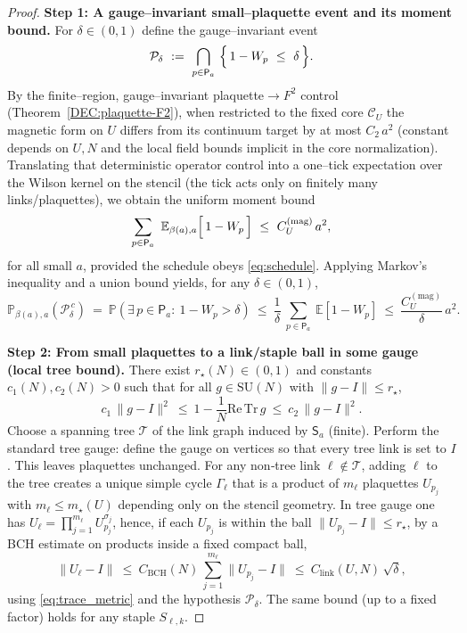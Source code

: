\documentclass[11pt]{amsart}
\theoremstyle{plain}
\theoremstyle{definition}
\theoremstyle{remark}
\renewcommand{\tfrac}[2]{\textstyle\frac{#1}{#2}}
\begin{document}
\begin{proof}
\textbf{Step 1: A gauge–invariant small–plaquette event and its moment bound.}
For $\delta\in(0,1)$ define the gauge–invariant event
\[
\mathcal P_\delta\ :=\ \bigcap_{p\in\mathsf P_a}\ \Bigl\{\,1-W_p\ \le\ \delta\,\Bigr\}.
\]
By the finite--region, gauge--invariant plaquette$\to F^2$ control (Theorem~\ref{DEC:plaquette-F2}), when restricted to the fixed core $\mathcal C_U$ the magnetic form on $U$ differs from its continuum target by at most $C_2\,a^2$ (constant depends on $U,N$ and the local field bounds implicit in the core normalization). Translating that deterministic operator control into a one--tick expectation over the Wilson kernel on the stencil (the tick acts only on finitely many links/plaquettes), we obtain the uniform moment bound
\begin{equation}
\label{eq:moment}
\sum_{p\in\mathsf P_a}\ \mathbb E_{\beta(a),a}\Bigl[\,1-W_p\,\Bigr]\ \le\ C_U^{(\mathrm{mag})}\,a^2,
\end{equation}
for all small $a$, provided the schedule obeys \eqref{eq:schedule}. Applying Markov's inequality and a union bound yields, for any $\delta\in(0,1)$,
\begin{equation}
\label{eq:P_small_plaquettes}
\mathbb P_{\beta(a),a}\!\left(\mathcal P_\delta^{\,c}\right)
\ =\ \mathbb P\!\left(\exists\,p\in\mathsf P_a:\ 1-W_p>\delta\right)
\ \le\ \frac{1}{\delta}\ \sum_{p\in\mathsf P_a}\ \mathbb E[1-W_p]
\ \le\ \frac{C_U^{(\mathrm{mag})}}{\delta}\,a^2.
\end{equation}

\medskip
\textbf{Step 2: From small plaquettes to a link/staple ball in some gauge (local tree bound).}
There exist $r_\star(N)\in(0,1)$ and constants $c_1(N),c_2(N)>0$ such that for all $g\in \mathrm{SU}(N)$ with $\|g-I\|\le r_\star$,
\begin{equation}
\label{eq:trace_metric}
c_1\,\|g-I\|^2\ \le\ 1-\tfrac1N\mathrm{Re\,Tr}\,g\ \le\ c_2\,\|g-I\|^2.
\end{equation}
Choose a spanning tree $\mathcal T$ of the link graph induced by $\mathsf S_a$ (finite). Perform the standard tree gauge: define the gauge on vertices so that every tree link is set to $I$. This leaves plaquettes unchanged. For any non‑tree link $\ell\notin\mathcal T$, adding $\ell$ to the tree creates a unique simple cycle $\Gamma_\ell$ that is a product of $m_\ell$ plaquettes $U_{p_j}$ with $m_\ell\le m_\star(U)$ depending only on the stencil geometry. In tree gauge one has $U_\ell = \prod_{j=1}^{m_\ell} U_{p_j}^{\sigma_j}$, hence, if each $U_{p_j}$ is within the ball $\|U_{p_j}-I\|\le r_\star$, by a BCH estimate on products inside a fixed compact ball,
\begin{equation}
\label{eq:link_bound}
\|U_\ell-I\|\ \le\ C_{\mathrm{BCH}}(N)\,\sum_{j=1}^{m_\ell}\|U_{p_j}-I\|\ \le\ C_{\mathrm{link}}(U,N)\,\sqrt{\delta},
\end{equation}
using \eqref{eq:trace_metric} and the hypothesis $\mathcal P_\delta$. The same bound (up to a fixed factor) holds for any staple $S_{\ell,k}$.


\end{proof}
\end{document}
